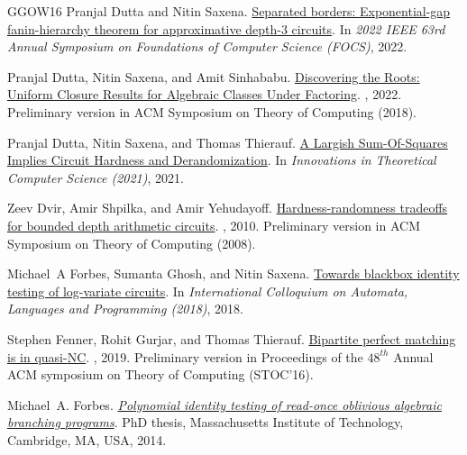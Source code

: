 \documentclass[10pt,a4paper]{article}
\numberwithin{equation}{section}
\begin{document}
\begin{thebibliography}{GGOW16}
Pranjal Dutta and Nitin Saxena.
\newblock \href {http://dx.doi.org/10.1109/FOCS54457.2022.00026} {Separated
  borders: Exponential-gap fanin-hierarchy theorem for approximative depth-3
  circuits}.
\newblock In {\em 2022 IEEE 63rd Annual Symposium on Foundations of Computer
  Science (FOCS)}, 2022.

Pranjal Dutta, Nitin Saxena, and Amit Sinhababu.
\newblock \href {http://dx.doi.org/10.1145/3510359} {Discovering the Roots:
  Uniform Closure Results for Algebraic Classes Under Factoring}.
, 2022.
\newblock Preliminary version in ACM Symposium on Theory of Computing (2018).

Pranjal Dutta, Nitin Saxena, and Thomas Thierauf.
\newblock \href{https://drops.dagstuhl.de/opus/volltexte/2021/13562}{A Largish
  Sum-Of-Squares Implies Circuit Hardness and Derandomization}.
\newblock In {\em Innovations in Theoretical Computer Science (2021)}, 2021.

Zeev Dvir, Amir Shpilka, and Amir Yehudayoff.
\newblock
  \href{https://epubs.siam.org/doi/abs/10.1137/080735850}{Hardness-randomness
  tradeoffs for bounded depth arithmetic circuits}.
, 2010.
\newblock Preliminary version in ACM Symposium on Theory of Computing (2008).

Michael~A Forbes, Sumanta Ghosh, and Nitin Saxena.
\newblock \href{https://drops.dagstuhl.de/opus/volltexte/2018/9058/}{Towards
  blackbox identity testing of log-variate circuits}.
\newblock In {\em International Colloquium on Automata, Languages and Programming (2018)}, 2018.

Stephen Fenner, Rohit Gurjar, and Thomas Thierauf.
\newblock
  \href{https://epubs.siam.org/doi/abs/10.1137/16M1097870?journalCode=smjcat}{Bipartite
  perfect matching is in quasi-{NC}}.
, 2019.
\newblock Preliminary version in Proceedings of the $48^{th}$ Annual ACM
  symposium on Theory of Computing (STOC'16).

Michael~A. Forbes.
\newblock \href {http://hdl.handle.net/1721.1/89843} {{\em Polynomial identity
  testing of read-once oblivious algebraic branching programs}}.
\newblock PhD thesis, Massachusetts Institute of Technology, Cambridge, MA,
  {USA}, 2014.


\end{thebibliography}
\end{document}
